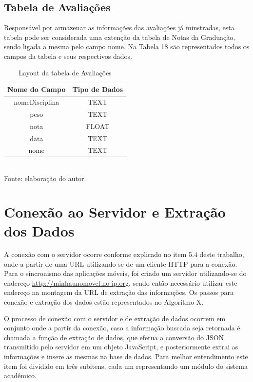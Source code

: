 \subsection{Tabela de Avaliações}
Responsável por armazenar as informações das avaliações já minstradas, esta tabela pode ser considerada uma extenção da tabela de Notas da Graduação, sendo ligada a mesma pelo campo nome. Na Tabela 18 são representados todos os campos da tabela e seus respectivos dados.
    
\begin{table}[!hbt]
\centering
\caption[Aplicação - Tabela de Avaliações]{Layout da tabela de Avaliações}
\vspace{3mm}
\begin{tabular}{c|c}\hline
\textbf{Nome do Campo} & \textbf{Tipo de Dados} \\ \hline
nomeDisciplina         & TEXT                   \\ \hline
peso                   & TEXT                   \\ \hline
nota                   & FLOAT                  \\ \hline
data                   & TEXT                   \\ \hline 
nome                   & TEXT                   \\ \hline
\end{tabular}
\\ Fonte: elaboração do autor.
\end{table}

\section{Conexão ao Servidor e Extração dos Dados}
A conexão com o servidor ocorre conforme explicado no item 5.4 deste trabalho, onde a partir de uma URL utilizando-se de um cliente HTTP para a conexão. Para o sincronismo das aplicações móveis, foi criado um servidor utilizando-se do endereço \url{http://minhaunomovel.no-ip.org}, sendo então necessário utilizar este endereço na montagem da URL de extração das informações. Os passos para conexão e extração dos dados estão representados no Algoritmo X.


O processo de conexão com o servidor e de extração de dados ocorrem em conjunto onde a partir da conexão, caso a informação buscada seja retornada é chamada a função de extração de dados, que efetua a conversão do JSON transmitido pelo servidor em um objeto JavaScript, e posteriormente extrai as informações e insere as mesmas na base de dados. Para melhor entendimento este item foi dividido em três subitens, cada um representando um módulo do sistema acadêmico.

